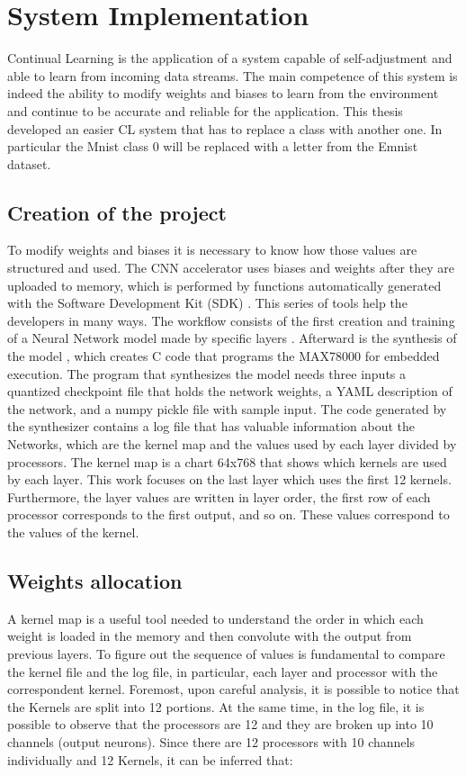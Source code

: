 \chapter{System Implementation}
\label{cha:system_implementation}
\quad Continual Learning is the application of a system capable of self-adjustment and able to learn from incoming data streams. The main competence of this system is indeed the ability to modify weights and biases to learn from the environment and continue to be accurate and reliable for the application. This thesis developed an easier CL system that has to replace a class with another one. In particular the Mnist \cite{deng2012mnist} class 0 will be replaced with a letter from the Emnist \cite{cohen2017emnist} dataset.

\section{Creation of the project}
\label{sec:creation_of_project}
\quad To modify weights and biases it is necessary to know how those values are structured and used. The CNN accelerator uses biases and weights after they are uploaded to memory, which is performed by functions automatically generated with the Software Development Kit (SDK) \cite{SDK}. This series of tools help the developers in many ways. The workflow consists of the first creation and training of a Neural Network model made by specific layers \cite{ai8x-training}. 
Afterward is the synthesis of the model \cite{ai8x-synthesis} , which creates C code that programs the MAX78000 for embedded execution. The program that synthesizes the model needs three inputs a quantized checkpoint file that holds the network weights, a YAML description of the network, and a numpy pickle file with sample input. The code generated by the synthesizer contains a log file that has valuable information about the Networks, which are the kernel map and the values used by each layer divided by processors. The kernel map is a chart 64x768 that shows which kernels are used by each layer. This work focuses on the last layer which uses the first 12 kernels. Furthermore, the layer values are written in layer order, the first row of each processor corresponds to the first output, and so on. These values correspond to the values of the kernel.

\section{Weights allocation}
\label{sec:weights_allocation}
\quad A kernel map is a useful tool needed to understand the order in which each weight is loaded in the memory and then convolute with the output from previous layers. To figure out the sequence of values is fundamental to compare the kernel file and the log file, in particular, each layer and processor with the correspondent kernel. Foremost, upon careful analysis, it is possible to notice that the Kernels are split into 12 portions. At the same time, in the log file, it is possible to observe that the processors are 12 and they are broken up into 10 channels (output neurons). Since there are 12 processors with 10 channels individually and 12 Kernels, it can be inferred that:

